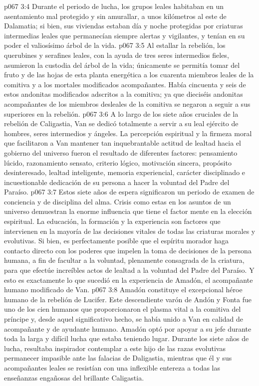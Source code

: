 \vs p067 3:4 Durante el periodo de lucha, los grupos leales habitaban en un asentamiento mal protegido y sin amurallar, a unos kilómetros al este de Dalamatia; si bien, sus viviendas estaban día y noche protegidas por criaturas intermedias leales que permanecían siempre alertas y vigilantes, y tenían en su poder el valiosísimo árbol de la vida.
\vs p067 3:5 Al estallar la rebelión, los querubines y serafines leales, con la ayuda de tres seres intermedios fieles, asumieron la custodia del árbol de la vida; únicamente se permitía tomar del fruto y de las hojas de esta planta energética a los cuarenta miembros leales de la comitiva y a los mortales modificados acompañantes. Había cincuenta y seis de estos andonitas modificados adscritos a la comitiva; ya que dieciséis andonitas acompañantes de los miembros desleales de la comitiva se negaron a seguir a sus superiores en la rebelión.
\vs p067 3:6 \pc A lo largo de los siete años cruciales de la rebelión de Caligastia, Van se dedicó totalmente a servir a su leal ejército de hombres, seres intermedios y ángeles. La percepción espiritual y la firmeza moral que facilitaron a Van mantener tan inquebrantable actitud de lealtad hacia el gobierno del universo fueron el resultado de diferentes factores: pensamiento lúcido, razonamiento sensato, criterio lógico, motivación sincera, propósito desinteresado, lealtad inteligente, memoria experiencial, carácter disciplinado e incuestionable dedicación de su persona a hacer la voluntad del Padre del Paraíso.
\vs p067 3:7 Estos siete años de espera significaron un periodo de examen de conciencia y de disciplina del alma. Crisis como estas en los asuntos de un universo demuestran la enorme influencia que tiene el factor mente en la elección espiritual. La educación, la formación y la experiencia son factores que intervienen en la mayoría de las decisiones vitales de todas las criaturas morales y evolutivas. Si bien, es perfectamente posible que el espíritu morador haga contacto directo con los poderes que impelen la toma de decisiones de la persona humana, a fin de facultar a la voluntad, plenamente consagrada de la criatura, para que efectúe increíbles actos de lealtad a la voluntad del Padre del Paraíso. Y esto es exactamente lo que sucedió en la experiencia de Amadón, el acompañante humano modificado de Van.
\vs p067 3:8 Amadón constituye el excepcional héroe humano de la rebelión de Lucifer. Este descendiente varón de Andón y Fonta fue uno de los cien humanos que proporcionaron el plasma vital a la comitiva del príncipe y, desde aquel significativo hecho, se había unido a Van en calidad de acompañante y de ayudante humano. Amadón optó por apoyar a su jefe durante toda la larga y difícil lucha que estaba teniendo lugar. Durante los siete años de lucha, resultaba inspirador contemplar a este hijo de las razas evolutivas permanecer impasible ante las falacias de Daligastia, mientras que él y sus acompañantes leales se resistían con una inflexible entereza a todas las enseñanzas engañosas del brillante Caligastia.
